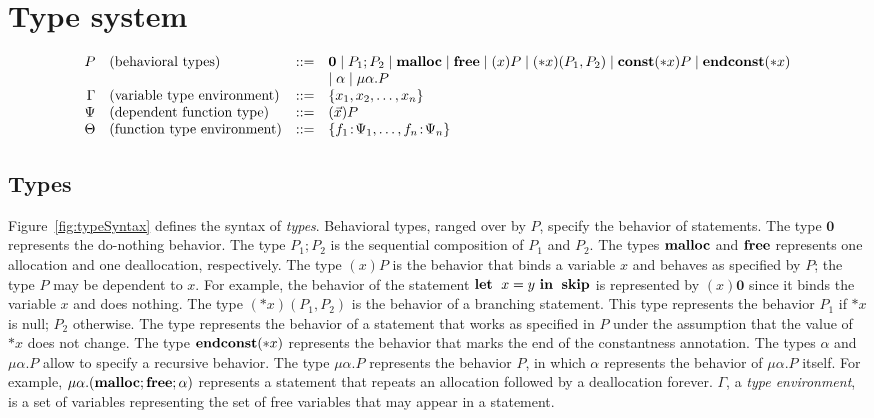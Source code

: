 \section{Type system}
\label{sec:typesystem}

\begin{figure*}
\[
\begin{array}{rlcl}
  P & (\mbox{behavioral types})&::=& \mathbf{0} \mid P_{1};P_{2} \mid \mathbf{malloc} \mid \mathbf{free} \mid (x)P \mid (*x)(P_1,P_2) \mid \mathbf{const}(*x) P  \mid \mathbf{endconst}(*x)\\
  &  &  & \mid \alpha \mid \mu\alpha.P\\
  \Gamma & (\mbox{variable type environment}) &::=& \{x_1, x_2, \dots, x_n\}\\
  \Psi & (\mbox{dependent function type}) &::=& (\vec{x})P\\
  \Theta & (\mbox{function type environment}) &::=& \{f_1\!:\! \Psi_1,\dots,f_n\!:\! \Psi_n\}\\
\end{array}
\]
\caption{Syntax of types.} 
\label{fig:typeSyntax}
\end{figure*}

\subsection{Types}

Figure~\ref{fig:typeSyntax} defines the syntax of \emph{types}.
Behavioral types, ranged over by \(P\), specify the behavior of
statements.  The type $\mathbf{0}$ represents the do-nothing behavior.
The type $P_1;P_2$ is the sequential composition of $P_1$ and $P_2$.
The types $\mathbf{malloc}$ and $\mathbf{free}$ represents one allocation and one
deallocation, respectively.  The type $(x)P$ is the behavior that binds
a variable $x$ and behaves as specified by $P$; the type $P$ may be
dependent to $x$.  For example, the behavior of the statement $\mathbf{let}\;\ x =
y\ \mathbf{in}\;\ \mathbf{skip}$ is represented by $(x)\mathbf{0}$ since it binds the
variable $x$ and does nothing. The type $(*x)(P_1,P_2)$ is the behavior
of a branching statement.  This type represents the behavior $P_1$ if
$*x$ is null; $P_2$ otherwise.  The type represents the behavior of a
statement that works as specified in $P$ under the assumption that the
value of $*x$ does not change.  The type $\mathbf{endconst}(*x)$ represents the
behavior that marks the end of the constantness annotation.  The types
$\alpha$ and $\mu\alpha.P$ allow to specify a recursive behavior.  The
type $\mu\alpha.P$ represents the behavior $P$, in which $\alpha$
represents the behavior of $\mu\alpha.P$ itself.  For example,
$\mu\alpha.(\mathbf{malloc};\mathbf{free};\alpha)$ represents a statement that repeats
an allocation followed by a deallocation forever.  $\Gamma$, a
\emph{type environment}, is a set of variables representing the set of
free variables that may appear in a statement.

